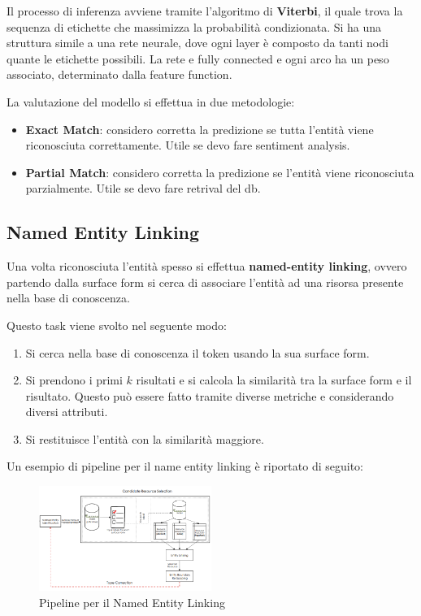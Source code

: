 Il processo di inferenza avviene tramite l'algoritmo di \textbf{Viterbi}, il quale
trova la sequenza di etichette che massimizza la probabilità condizionata. Si ha
una struttura simile a una rete neurale, dove ogni layer è composto da tanti nodi
quante le etichette possibili. La rete e fully connected e ogni arco ha un peso
associato, determinato dalla feature function.

La valutazione del modello si effettua in due metodologie:
\begin{itemize}
      \item \textbf{Exact Match}: considero corretta la predizione se tutta l'entità
            viene riconosciuta correttamente. Utile se devo fare sentiment analysis.
      \item \textbf{Partial Match}: considero corretta la predizione se l'entità
            viene riconosciuta parzialmente. Utile se devo fare retrival del db.
\end{itemize}
\subsection{Named Entity Linking}
Una volta riconosciuta l'entità spesso si effettua \textbf{named-entity linking},
ovvero partendo dalla surface form si cerca di associare l'entità ad una risorsa
presente nella base di conoscenza.

Questo task viene svolto nel seguente modo:
\begin{enumerate}
      \item Si cerca nella base di conoscenza il token usando la sua surface form.
      \item Si prendono i primi $k$ risultati e si calcola la similarità tra
            la surface form e il risultato. Questo può essere fatto tramite
            diverse metriche e considerando diversi attributi.
      \item Si restituisce l'entità con la similarità maggiore.
\end{enumerate}

Un esempio di pipeline per il name entity linking è riportato di seguito:
\begin{figure}[!ht]
      \centering
      \includegraphics[width=0.5\textwidth]{./img/nlp/nel.png}
      \caption{Pipeline per il Named Entity Linking}
      \label{fig:nel}
\end{figure}

